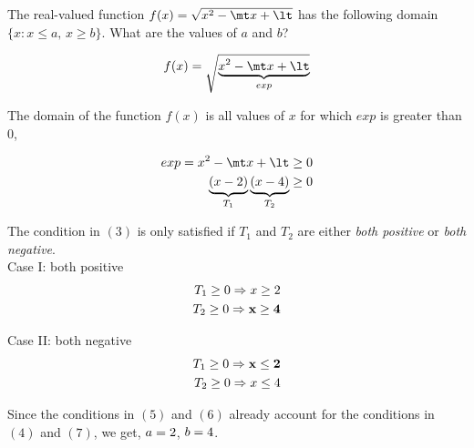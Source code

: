 

\ADD\va\vb\mt
\MULTIPLY\va\vb\lt

\question[3] The real-valued function $f(x) = \sqrt{x^2-\mt x+\lt}$ has
the following domain $\{x : x \leq a,\, x \geq b\}$. What are the 
values of $a$ and $b$?

\watchout

\begin{solution}[\halfpage]

  \begin{align}
    f(x) = \sqrt{\underbrace{ x^2 -\mt x + \lt}_{exp}}
  \end{align}

  The domain of the function $f(x)$ is all values of $x$ for which
  $exp$ is greater than $0$,
  
  \begin{align}
    exp = x^2 -\mt x + \lt \geq 0 \\
    \underbrace{(x - \va)}_{T_1}\underbrace{(x - \vb)}_{T_2} \geq 0
  \end{align}
  
  The condition in $(3)$ is only satisfied if $T_1$ and $T_2$
  are either \textit{both positive} or \textit{both negative}.\\
  
  Case I: both positive
  \begin{align}
    T_1 \geq 0 \Rightarrow x \geq 2 \\
    T_2 \geq 0 \Rightarrow \mathbf{x \geq 4}    
  \end{align}
  
  Case II: both negative
  \begin{align}
    T_1 \geq 0 \Rightarrow \mathbf{x \leq 2} \\
    T_2 \geq 0 \Rightarrow x \leq 4 
  \end{align}

  Since the conditions in $(5)$ and $(6)$ already account
  for the conditions in $(4)$ and $(7)$, we get, $a=2$, $b=4$.  

\end{solution}
